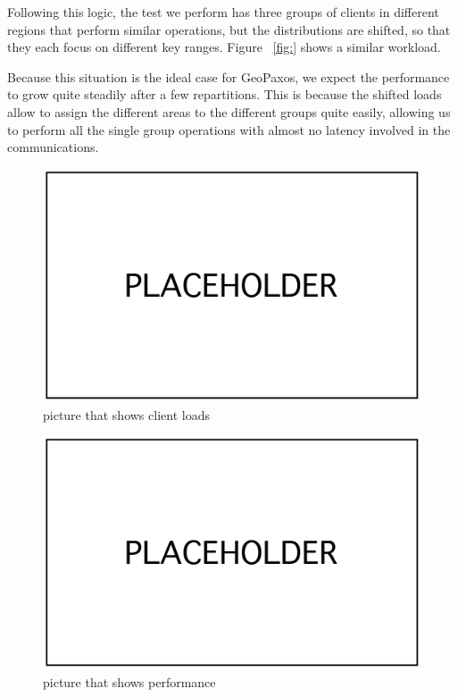 Following this logic, the test we perform has three groups of clients in different regions that perform similar operations, but the distributions are shifted, so that they each focus on different key ranges. Figure ~\ref{fig:} shows a similar workload.

Because this situation is the ideal case for GeoPaxos, we expect the performance to grow quite steadily after a few repartitions. This is because the shifted loads allow to assign the different areas to the different groups quite easily, allowing us to perform all the single group operations with almost no latency involved in the communications.

\begin{figure}[!htb]
  \centering
  \includegraphics[width=\textwidth,height=\textheight,keepaspectratio]{img/placeholder.png}
  \caption[caption]{ picture that shows client loads }
  \label{fig:local-skewed-loads}
\end{figure}

\begin{figure}[!htb]
  \centering
  \includegraphics[width=\textwidth,height=\textheight,keepaspectratio]{img/placeholder.png}
  \caption[caption]{ picture that shows performance }
  \label{fig:local-skewed-performance}
\end{figure}

